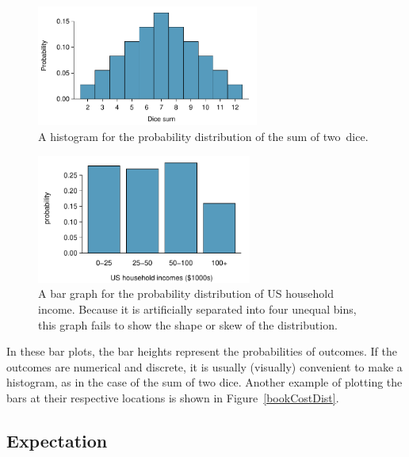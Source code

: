 \begin{figure}[h]
\centering
\includegraphics[width=0.65\textwidth]{ch_probability/figures/diceSumDist/diceSumDist}
\caption{A histogram for the probability distribution of the sum of two~dice.}
\label{diceSumDist}
\end{figure}

\begin{figure}[h]
\centering
\includegraphics[width=0.63\textwidth]{ch_probability/figures/usHouseholdIncomeDistBar/usHouseholdIncomeDistBar}
\caption{A bar graph for the probability distribution of US household income. Because it is artificially separated into four unequal bins, this graph fails to show the shape or skew of the distribution.}
\label{usHouseholdIncomeDistBar}
\end{figure}

In these bar plots, the bar heights represent the probabilities of outcomes. If the outcomes are numerical and discrete, it is usually (visually) convenient to make a histogram, as in the case of the sum of two dice. Another example of plotting the bars at their respective locations is shown in Figure~\ref{bookCostDist}.



\D{\newpage}

\subsection{Expectation}


